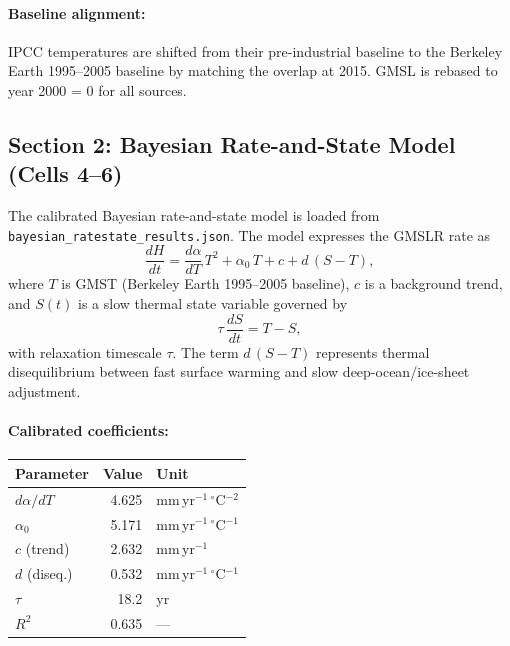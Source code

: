 \documentclass[11pt]{article}
\begin{document}
\paragraph{Baseline alignment:}
IPCC temperatures are shifted from their pre-industrial baseline to the Berkeley Earth 1995--2005 baseline by matching the overlap at 2015.  GMSL is rebased to year 2000 = 0 for all sources.

\subsection{Section 2: Bayesian Rate-and-State Model (Cells 4--6)}

The calibrated Bayesian rate-and-state model is loaded from \texttt{bayesian\_ratestate\_results.json}.  The model expresses the GMSLR rate as
\begin{equation}
    \frac{dH}{dt} = \frac{d\alpha}{dT}\,T^2 + \alpha_0\,T + c + d\,(S - T),
    \label{eq:rate}
\end{equation}
where $T$ is GMST (Berkeley Earth 1995--2005 baseline), $c$ is a background trend, and $S(t)$ is a slow thermal state variable governed by
\begin{equation}
    \tau\,\frac{dS}{dt} = T - S,
    \label{eq:state}
\end{equation}
with relaxation timescale $\tau$.  The term $d\,(S - T)$ represents thermal disequilibrium between fast surface warming and slow deep-ocean/ice-sheet adjustment.

\paragraph{Calibrated coefficients:}
\begin{center}
\begin{tabular}{lrl}
\toprule
Parameter & Value & Unit \\
\midrule
$d\alpha/dT$ & 4.625 & mm\,yr$^{-1}$\,$^\circ$C$^{-2}$ \\
$\alpha_0$   & 5.171 & mm\,yr$^{-1}$\,$^\circ$C$^{-1}$ \\
$c$ (trend)  & 2.632 & mm\,yr$^{-1}$ \\
$d$ (diseq.) & 0.532 & mm\,yr$^{-1}$\,$^\circ$C$^{-1}$ \\
$\tau$       & 18.2  & yr \\
$R^2$        & 0.635 & --- \\
\bottomrule
\end{tabular}
\end{center}
\end{document}
